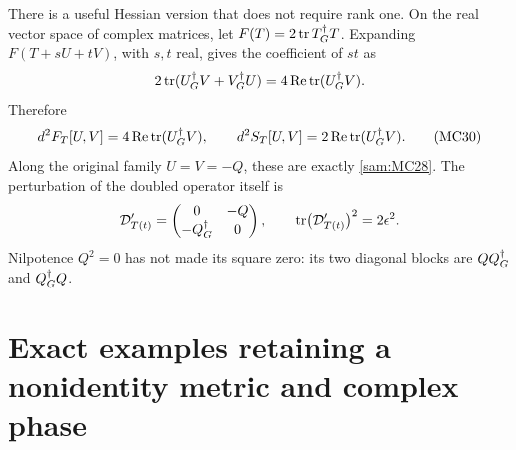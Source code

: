 \documentclass[11pt]{article}
\begin{document}
There is a useful Hessian version that does not require rank one.
On the real vector space of complex matrices, let
\(F(T)=2\operatorname{tr} T^\dagger_G T\). Expanding \(F(T+sU+tV)\), with \(s,t\)
real, gives the coefficient of \(st\) as
\[
 2\operatorname{tr}(U^\dagger_G V+V^\dagger_G U)=4\operatorname{Re}\operatorname{tr}(U^\dagger_G V).
\]
Therefore
\begin{equation}
 d^2F_T[U,V]=4\operatorname{Re}\operatorname{tr}(U^\dagger_G V),\qquad
 d^2S_T[U,V]=2\operatorname{Re}\operatorname{tr}(U^\dagger_G V).
 \tag{MC30}\label{sam:MC30}
\end{equation}
Along the original family \(U=V=-Q\), these are exactly \eqref{sam:MC28}.
The perturbation of the doubled operator itself is
\[
 \mathcal D_{T(t)}'=
 \begin{pmatrix}0&-Q\\-Q^\dagger_G&0\end{pmatrix},
 \qquad
 \operatorname{tr}\bigl(\mathcal D_{T(t)}'\bigr)^2=2\epsilon^2.
\]
Nilpotence \(Q^2=0\) has not made its square zero: its two diagonal
blocks are \(QQ^\dagger_G\) and \(Q^\dagger_G Q\).

\section{Exact examples retaining a nonidentity metric and complex phase}
\end{document}
